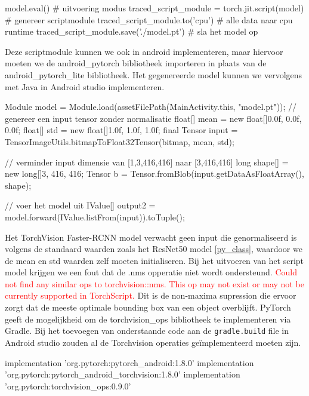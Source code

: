 \begin{python}
model.eval() # uitvoering modus
traced_script_module = torch.jit.script(model) # genereer scriptmodule
traced_script_module.to('cpu') # alle data naar cpu runtime
traced_script_module.save('./model.pt') # sla het model op 
\end{python}

Deze scriptmodule kunnen we ook in android implementeren, maar hiervoor moeten we de android\_pytorch bibliotheek importeren in plaats van de android\_pytorch\_lite bibliotheek.
Het gegenereerde model kunnen we vervolgens met Java in Android studio implementeren.

\begin{python}
Module model = Module.load(assetFilePath(MainActivity.this, "model.pt"));
// genereer een input tensor zonder normalisatie
float[] mean = new float[]{0.0f, 0.0f, 0.0f};
float[] std = new float[]{1.0f, 1.0f, 1.0f};
final Tensor input = TensorImageUtils.bitmapToFloat32Tensor(bitmap, mean, std);

// verminder input dimensie van [1,3,416,416] naar [3,416,416]
long shape[] = new long[]{3, 416, 416};
Tensor b = Tensor.fromBlob(input.getDataAsFloatArray(), shape);

// voer het model uit
IValue[] output2 = model.forward(IValue.listFrom(input)).toTuple();
\end{python}

Het TorchVision Faster-RCNN model verwacht geen input die genormaliseerd is volgens de standaard waarden zoals het ResNet50 model \ref{py_class}, waardoor we de mean en std waarden zelf moeten initialiseren.
Bij het uitvoeren van het script model krijgen we een fout dat de .nms opperatie niet wordt ondersteund.
\textcolor{red}{Could not find any similar ops to torchvision::nms. This op may not exist or may not be currently supported in TorchScript.}
\newline
Dit is de non-maxima supression die ervoor zorgt dat de meeste optimale bounding box van een object overblijft. 
PyTorch geeft de mogelijkheid om de torchvision\_ops bibliotheek te implementeren via Gradle.
Bij het toevoegen van onderstaande code aan de \texttt{gradle.build} file in Android studio zouden al de Torchvision operaties ge\"implementeerd moeten zijn.

\begin{python}
implementation 'org.pytorch:pytorch_android:1.8.0'
implementation 'org.pytorch:pytorch_android_torchvision:1.8.0'
implementation 'org.pytorch:torchvision_ops:0.9.0'
\end{python}

